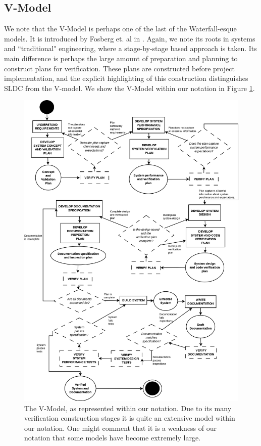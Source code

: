 \subsection{V-Model}

We note that the V-Model is perhaps one of the last of the Waterfall-esque models.
It is introduced by Fosberg et. al in \cite{forsberg1995relationship}.
Again, we note its roots in systems and ``traditional" engineering, where a stage-by-stage based
approach is taken.
Its main difference is perhaps the large amount of preparation and planning to construct plans for
verification.
These plans are constructed before project implementation, and the explicit highlighting of this
construction distinguishes SLDC from the V-model.
We show the V-Model within our notation in Figure \ref{VModel}.

\begin{figure}
	\centering
	\includegraphics[scale=0.3]{media/VModel}
	\caption{The V-Model, as represented within our notation. Due to its many verification construction stages it is quite an extensive
		model within our notation. One might comment that it is a weakness of our notation that some
			models have become extremely large.}
	\label{VModel}
\end{figure}

